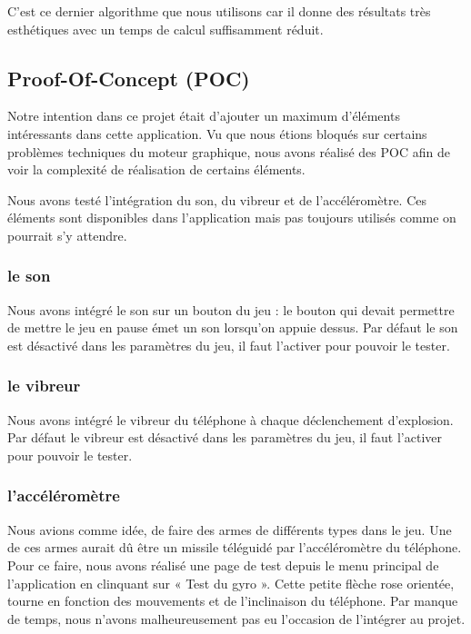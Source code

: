 \documentclass{report}
\begin{document}
C’est ce dernier algorithme que nous utilisons car il donne des résultats très esthétiques avec un temps de calcul suffisamment réduit.

\subsection{Proof-Of-Concept (POC)}

Notre intention dans ce projet était d’ajouter un maximum d'éléments intéressants dans cette application. Vu que nous étions bloqués sur certains problèmes techniques du moteur graphique, nous avons réalisé des POC afin de voir la complexité de réalisation de certains éléments.

Nous avons testé l’intégration du son, du vibreur et de l’accéléromètre. Ces éléments sont disponibles dans l’application mais pas toujours utilisés comme on pourrait s’y attendre.

\subsubsection{le son}

Nous avons intégré le son sur un bouton du jeu : le bouton qui devait permettre de mettre le jeu en pause émet un son lorsqu’on appuie dessus. Par défaut le son est désactivé dans les paramètres du jeu, il faut l’activer pour pouvoir le tester.

\subsubsection{le vibreur}

Nous avons intégré le vibreur du téléphone à chaque déclenchement d’explosion. Par défaut le vibreur est désactivé dans les paramètres du jeu, il faut l’activer pour pouvoir le tester.

\subsubsection{l’accéléromètre}

Nous avions comme idée, de faire des armes de différents types dans le jeu. Une de ces armes aurait dû être un missile téléguidé par l’accéléromètre du téléphone. Pour ce faire, nous avons réalisé une page de test depuis le menu principal de l’application en clinquant sur « Test du gyro ». Cette petite flèche rose orientée, tourne en fonction des mouvements et de l’inclinaison du téléphone. Par manque de temps, nous n’avons malheureusement pas eu l’occasion de l’intégrer au projet.
\end{document}
